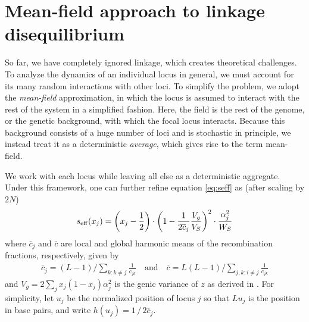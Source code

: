 \documentclass[10pt]{article}
\begin{document}
\section{Mean-field approach to linkage disequilibrium}
\label{sec:meanfield_ld}

So far, we have completely ignored linkage, which creates theoretical challenges.
To analyze the dynamics of an individual locus in general, we must account for its many random interactions with other loci.
To simplify the problem, we adopt the \emph{mean-field} approximation, in which the locus is assumed to interact with the rest of the system in a simplified fashion.
Here, the field is the rest of the genome, or the genetic background, with which the focal locus interacts.
Because this background consists of a huge number of loci and is stochastic in principle, we instead treat it as a deterministic \emph{average}, which gives rise to the term mean-field.

We work with each locus while leaving all else as a deterministic aggregate.
Under this framework, one can further refine equation \eqref{eq:seff} as (after scaling by $2N$)
\begin{align} \label{eq:seff_ld}
    s_{\mathrm{eff}}(x_j) = \left(x_j-\frac{1}{2}\right)\cdot \left( 
    1- \frac{1}{2\overline{c}_j}\frac{V_g}{V_S}
    \right)^2 \cdot \frac{\alpha_j^2}{W_S} 
\end{align}
where $\overline{c}_j$ and $\overline{c}$ are local and global harmonic means of the recombination fractions, respectively, given by
\begin{gather}
    \overline{c}_j = (L-1) \bigg/ \sum_{k:k \neq j} \frac{1}{c_{jk}}
    \quad \text{and} \quad
    \overline{c} = L(L-1) \bigg/ \sum_{j,k:i \neq j} \frac{1}{c_{jk}}
\end{gather}
and $V_g = 2\sum_j x_j(1-x_j)\alpha_j^2$ is the genic variance of $z$ as derived in \citet{Negm_2026}.
For simplicity, let $u_j$ be the normalized position of locus $j$ so that $Lu_j$ is the position in base pairs, and write $h(u_j) = 1\, / \, 2\overline{c}_j$.
\end{document}
